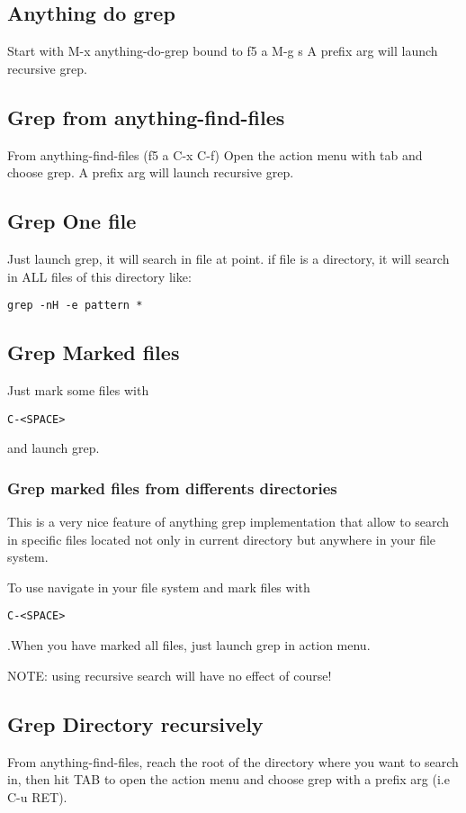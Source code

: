 \documentclass[a4paper,11pt]{article}
\begin{document}
\subsection{Anything do grep}
\label{sec:anything-do-grep}
Start with M-x anything-do-grep bound to f5 a M-g s
A prefix arg will launch recursive grep.

\subsection{Grep from anything-find-files}
\label{sec:grep-from-anything}
From anything-find-files (f5 a C-x C-f) Open the action menu with tab and choose grep.
A prefix arg will launch recursive grep.

\subsection{Grep One file}
\label{sec:grep-one-file}
Just launch grep, it will search in file at point.
if file is a directory, it will search in ALL files of this directory like:

\begin{verbatim}
grep -nH -e pattern *
\end{verbatim}


\subsection{Grep Marked files}
\label{sec:grep-marked-files}
Just mark some files with
\begin{verbatim}
C-<SPACE>
\end{verbatim}
and launch grep.
\subsubsection{Grep marked files from differents directories}
\label{sec:grep-marked-files-1}
This is a very nice feature of anything grep implementation that allow to search in specific files located not
only in current directory but anywhere in your file system.

To use navigate in your file system and mark files with 
\begin{verbatim}
C-<SPACE> 
\end{verbatim}
.When you have marked all files, just launch grep in action menu.

NOTE: using recursive search will have no effect of course!

\subsection{Grep Directory recursively}
\label{sec:grep-direct-recurs}
From anything-find-files, reach the root of the directory where you want to search in,
then hit TAB to open the action menu and choose grep with a prefix arg (i.e C-u RET).
\end{document}
